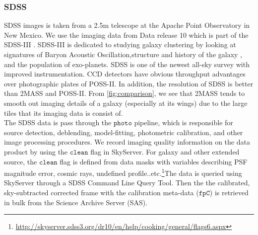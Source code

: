 \documentclass[authoryear, 12pt,5p, times]{elsarticle}
\begin{document}
	\subsubsection{SDSS}
	SDSS images is taken from a 2.5m telescope at the Apache Point Observatory in New Mexico. We use the imaging data from Data release 10 which is part of the SDSS-III . SDSS-III is dedicated to studying galaxy clustering by looking at signatures of Baryon Acoustic Oscillation,structure and history of the galaxy , and the population of exo-planets.  SDSS is  one of the newest all-sky survey with improved instrumentation. CCD detectors have obvious throughput advantages over photographic plates of POSS-II. In addition, the resolution of SDSS is better than 2MASS and POSS-II.  From \autoref{fig:comparison}, we see that 2MASS tends to smooth out imaging details of a galaxy (especially at its wings)  due to the large tiles that its imaging data is consist of.
\\
\indent The SDSS data is pass through the $\texttt{photo}$ pipeline, which is responsible for source detection, deblending, model-fitting, photometric calibration, and other image processing procedures. We record imaging quality information on the data product by using the $\texttt{clean}$ flag in SkyServer. For galaxy and other extended source, the $\texttt{clean}$ flag is defined from data masks with variables describing PSF magnitude error, cosmic rays, undefined profile..etc.\footnote{\url{http://skyserver.sdss3.org/dr10/en/help/cooking/general/flags6.aspx}}The data is queried using SkyServer through a SDSS Command Line Query Tool. Then the the calibrated, sky-subtracted corrected frame with the calibration meta-data ($\texttt{fpC}$) is retrieved in bulk from the Science Archive Server (SAS). 
\end{document}
